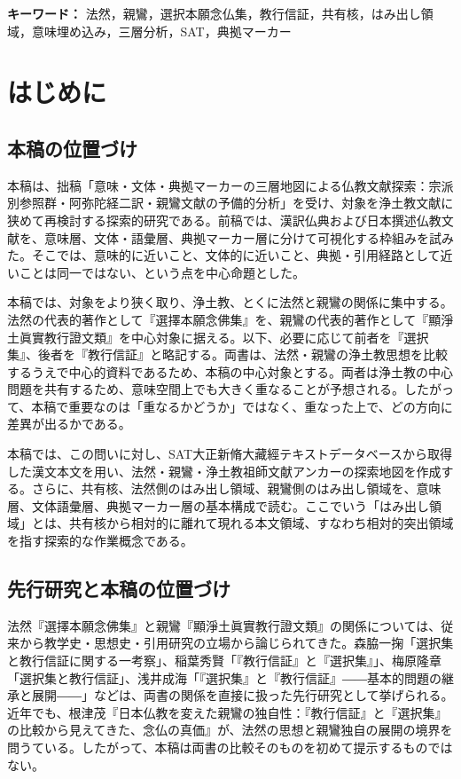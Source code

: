 \documentclass[uplatex,dvipdfmx,11pt,a4paper]{jsarticle}
\begin{document}
\noindent\textbf{キーワード：} 法然，親鸞，選択本願念仏集，教行信証，共有核，はみ出し領域，意味埋め込み，三層分析，SAT，典拠マーカー

\section{はじめに}

\subsection{本稿の位置づけ}

本稿は、拙稿「意味・文体・典拠マーカーの三層地図による仏教文献探索：宗派別参照群・阿弥陀経二訳・親鸞文献の予備的分析」\cite{ueyama2026three-layer-map}を受け、対象を浄土教文献に狭めて再検討する探索的研究である。前稿では、漢訳仏典および日本撰述仏教文献を、意味層、文体・語彙層、典拠マーカー層に分けて可視化する枠組みを試みた。そこでは、意味的に近いこと、文体的に近いこと、典拠・引用経路として近いことは同一ではない、という点を中心命題とした。

本稿では、対象をより狭く取り、浄土教、とくに法然と親鸞の関係に集中する。法然の代表的著作として『選擇本願念佛集』を、親鸞の代表的著作として『顯淨土眞實教行證文類』を中心対象に据える。以下、必要に応じて前者を『選択集』、後者を『教行信証』と略記する。両書は、法然・親鸞の浄土教思想を比較するうえで中心的資料であるため、本稿の中心対象とする。両者は浄土教の中心問題を共有するため、意味空間上でも大きく重なることが予想される。したがって、本稿で重要なのは「重なるかどうか」ではなく、重なった上で、どの方向に差異が出るかである。

本稿では、この問いに対し、SAT大正新脩大藏經テキストデータベースから取得した漢文本文を用い、法然・親鸞・浄土教祖師文献アンカーの探索地図を作成する。さらに、共有核、法然側のはみ出し領域、親鸞側のはみ出し領域を、意味層、文体語彙層、典拠マーカー層の基本構成で読む。ここでいう「はみ出し領域」とは、共有核から相対的に離れて現れる本文領域、すなわち相対的突出領域を指す探索的な作業概念である。

\subsection{先行研究と本稿の位置づけ}

法然『選擇本願念佛集』と親鸞『顯淨土眞實教行證文類』の関係については、従来から教学史・思想史・引用研究の立場から論じられてきた。森脇一掬「選択集と教行信証に関する一考察」\cite{moriwaki1953}、稲葉秀賢「『教行信証』と『選択集』」\cite{inaba1972}、梅原隆章「選択集と教行信証」\cite{umehara1974}、浅井成海「『選択集』と『教行信証』――基本的問題の継承と展開――」\cite{asai2004}などは、両書の関係を直接に扱った先行研究として挙げられる。近年でも、根津茂『日本仏教を変えた親鸞の独自性：『教行信証』と『選択集』の比較から見えてきた、念仏の真価』が、法然の思想と親鸞独自の展開の境界を問うている\cite{nezu2024}。したがって、本稿は両書の比較そのものを初めて提示するものではない。
\end{document}

